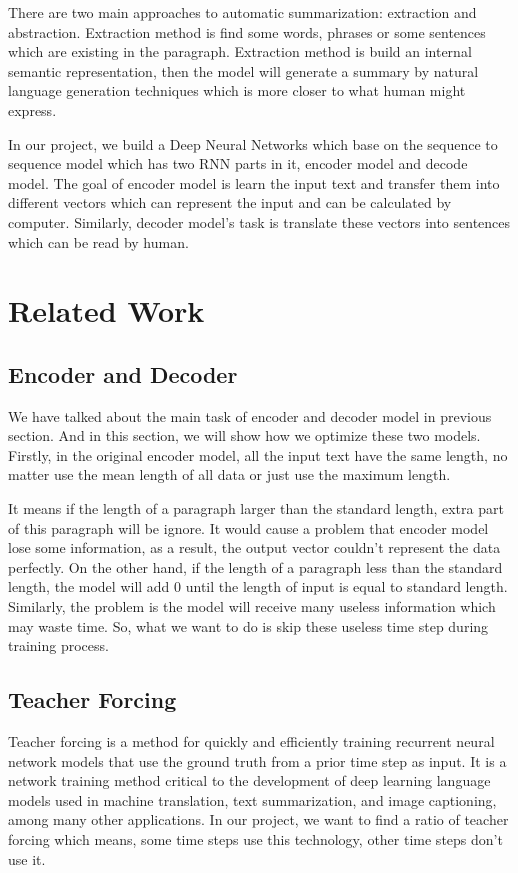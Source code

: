 \documentclass[sigconf]{acmart}
\begin{document}
There are two main approaches to automatic summarization: extraction and abstraction. Extraction method is find some words, phrases or some sentences which are existing in the paragraph. Extraction method is build an internal semantic representation, then the model will generate a summary by natural language generation techniques which is more closer to what human might express.

In our project, we build a Deep Neural Networks which base on the sequence to sequence model which has two RNN parts in it, encoder model and decode model. The goal of encoder model is learn the input text and transfer them into different vectors which can represent the input and can be calculated by computer. Similarly, decoder model's task is translate these vectors into sentences which can be read by human.

\section{Related Work}
\subsection{Encoder and Decoder}
We have talked about the main task of encoder and decoder model in previous section. And in this section, we will show how we optimize these two models. Firstly, in the original encoder model, all the input text have the same length, no matter use the mean length of all data or just use the maximum length. 

It means if the length of a paragraph larger than the standard length, extra part of this paragraph will be ignore. It would cause a problem that encoder model lose some information, as a result, the output vector couldn't represent the data perfectly. On the other hand, if the length of a paragraph less than the standard length, the model will add 0 until the length of input is equal to standard length. Similarly, the problem is the model will receive many useless information which may waste time. So, what we want to do is skip these useless time step during training process.

\subsection{Teacher Forcing}
Teacher forcing is a method for quickly and efficiently training recurrent neural network models that use the ground truth from a prior time step as input. It is a network training method critical to the development of deep learning language models used in machine translation, text summarization, and image captioning, among many other applications. In our project, we want to find a ratio of teacher forcing which means, some time steps use this technology, other time steps don't use it.
\end{document}
